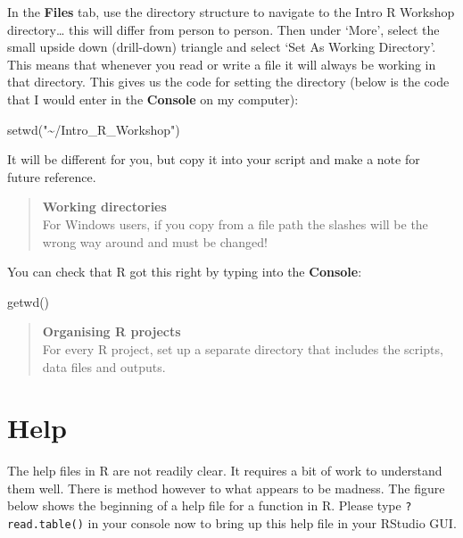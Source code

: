 \documentclass[
]{book}
\newenvironment{Shaded}{\begin{snugshade}}{\end{snugshade}}
\newcommand{\FunctionTok}[1]{\textcolor[rgb]{0.00,0.00,0.00}{#1}}
\newcommand{\NormalTok}[1]{#1}
\newcommand{\StringTok}[1]{\textcolor[rgb]{0.31,0.60,0.02}{#1}}
\begin{document}
In the \textbf{Files} tab, use the directory structure to navigate to the Intro R Workshop directory\ldots{} this will differ from person to person. Then under `More', select the small upside down (drill-down) triangle and select `Set As Working Directory'. This means that whenever you read or write a file it will always be working in that directory. This gives us the code for setting the directory (below is the code that I would enter in the \textbf{Console} on my computer):

\begin{Shaded}
\begin{Highlighting}[]
\FunctionTok{setwd}\NormalTok{(}\StringTok{"\textasciitilde{}/Intro\_R\_Workshop"}\NormalTok{)}
\end{Highlighting}
\end{Shaded}

It will be different for you, but copy it into your script and make a note for future reference.

\begin{quote}
\textbf{Working directories}\\
For Windows users, if you copy from a file path the slashes will be the wrong way around and must be changed!
\end{quote}

You can check that R got this right by typing into the \textbf{Console}:

\begin{Shaded}
\begin{Highlighting}[]
\FunctionTok{getwd}\NormalTok{()}
\end{Highlighting}
\end{Shaded}

\begin{quote}
\textbf{Organising R projects}\\
For every R project, set up a separate directory that includes the scripts, data files and outputs.
\end{quote}

\hypertarget{help}{%
\section{Help}\label{help}}

The help files in R are not readily clear. It requires a bit of work to understand them well. There is method however to what appears to be madness. The figure below shows the beginning of a help file for a function in R. Please type \texttt{?read.table()} in your console now to bring up this help file in your RStudio GUI.
\end{document}
